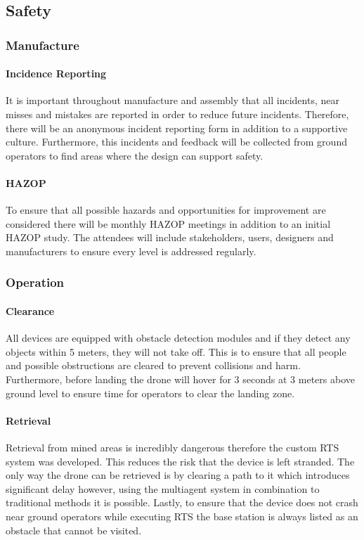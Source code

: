 \subsection{Safety}
\subsubsection{Manufacture}
\paragraph{Incidence Reporting}
It is important throughout manufacture and assembly that all incidents, near misses and mistakes are reported in order to reduce future incidents. Therefore, there will be an anonymous incident reporting form in addition to a supportive culture. Furthermore, this incidents and feedback will be collected from ground operators to find areas where the design can support safety.
\paragraph{\gls{HAZOP}}
To ensure that all possible hazards and opportunities for improvement are considered there will be monthly \gls{HAZOP} meetings in addition to an initial \gls{HAZOP} study. The attendees will include stakeholders, users, designers and manufacturers to ensure every level is addressed regularly.

\subsubsection{Operation}
\paragraph{Clearance}
All devices are equipped with obstacle detection modules and if they detect any objects within 5 meters, they will not take off. This is to ensure that all people and possible obstructions are cleared to prevent collisions and harm. Furthermore, before landing the drone will hover for 3 seconds at 3 meters above ground level to ensure time for operators to clear the landing zone.
\paragraph{Retrieval}
Retrieval from mined areas is incredibly dangerous therefore the custom \gls{RTS} system was developed. This reduces the risk that the device is left stranded. The only way the drone can be retrieved is by clearing a path to it which introduces significant delay however, using the multiagent system in combination to traditional methods it is possible. Lastly, to ensure that the device does not crash near ground operators while executing \gls{RTS} the base station is always listed as an obstacle that cannot be visited.